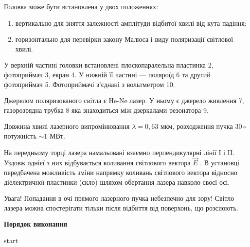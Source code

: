 \documentclass[12pt,a4paper]{article}
\begin{document}
    Головка може бути встановлена у двох положеннях:

    \begin{enumerate}[label=\alph*)]
        \item вертикально для зняття залежності амплітуди відбитої хвилі від кута падіння;
        \item горизонтально для перевірки закону Малюса і виду поляризації світлової хвилі.
    \end{enumerate}

    У верхній частині головки встановлені
    плоскопаралельна пластинка 2, фотоприймач 3,
    екран 4. У нижній її частині --- поляроїд 6 та
    другий фотоприймач 5. Фотоприймачі з'єднані з
    вольтметром 10.

    Джерелом поляризованого світла є He-Ne
    лазер. У ньому є джерело живлення 7, газорозрядна трубка 8 яка знаходиться між
    дзеркалами резонатора 9.

    Довжина хвилі лазерного випромінювання $\lambda = 0{,}63$ мкм,
    розходження пучка $30\circ$ потужність $\sim 1$ МВт.

    На передньому торці лазера намальовані взаємно перпендикулярні лінії І і II.
    Уздовж однієї з них відбувається коливання світлового вектора $\vec{E}$ . В установці
    передбачена можливість зміни напрямку коливань світлового вектора відносно
    діелектричної пластинки (скло) шляхом обертання лазера навколо своєї осі.

    Увага! Попадання в очі прямого лазерного пучка небезпечно для зору! Світло лазера
    можна спостерігати тільки після відбиття від поверхонь, що розсіюють.

    \newpage

    \begin{center} \textbf{Порядок виконання} \end{center}

    \newpage

    start
\end{document}
